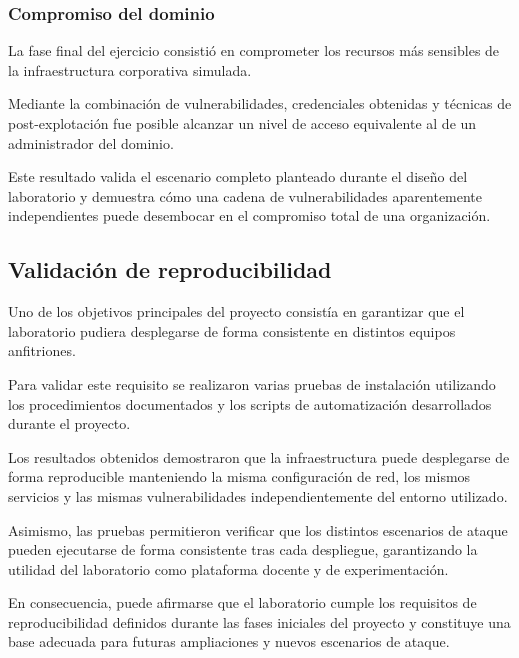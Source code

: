 
\subsubsection{Compromiso del dominio}

La fase final del ejercicio consistió en comprometer los recursos más sensibles de la infraestructura corporativa simulada.

Mediante la combinación de vulnerabilidades, credenciales obtenidas y técnicas de post-explotación fue posible alcanzar un nivel de acceso equivalente al de un administrador del dominio.

Este resultado valida el escenario completo planteado durante el diseño del laboratorio y demuestra cómo una cadena de vulnerabilidades aparentemente independientes puede desembocar en el compromiso total de una organización.

%


\subsection{Validación de reproducibilidad}

Uno de los objetivos principales del proyecto consistía en garantizar que el laboratorio pudiera desplegarse de forma consistente en distintos equipos anfitriones.

Para validar este requisito se realizaron varias pruebas de instalación utilizando los procedimientos documentados y los scripts de automatización desarrollados durante el proyecto.

Los resultados obtenidos demostraron que la infraestructura puede desplegarse de forma reproducible manteniendo la misma configuración de red, los mismos servicios y las mismas vulnerabilidades independientemente del entorno utilizado.

Asimismo, las pruebas permitieron verificar que los distintos escenarios de ataque pueden ejecutarse de forma consistente tras cada despliegue, garantizando la utilidad del laboratorio como plataforma docente y de experimentación.

En consecuencia, puede afirmarse que el laboratorio cumple los requisitos de reproducibilidad definidos durante las fases iniciales del proyecto y constituye una base adecuada para futuras ampliaciones y nuevos escenarios de ataque.